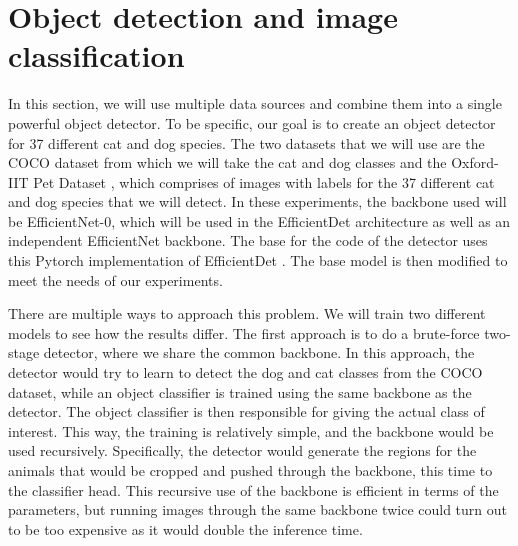 \section{Object detection and image classification}
In this section, we will use multiple data sources and combine them into a single powerful object detector.
To be specific, our goal is to create an object detector for 37 different cat and dog species.
The two datasets that we will use are the COCO dataset \citep{COCO} from which we will take the cat and dog classes and the Oxford-IIT Pet Dataset \citep{catsdogs}, which comprises of images with labels for the 37 different cat and dog species that we will detect.
In these experiments, the backbone used will be EfficientNet-0, which will be used in the EfficientDet architecture as well as an independent EfficientNet backbone.
The base for the code of the detector uses this Pytorch implementation of EfficientDet \citep{pytorch-efficientdet}.
The base model is then modified to meet the needs of our experiments.

There are multiple ways to approach this problem.
We will train two different models to see how the results differ.
The first approach is to do a brute-force two-stage detector, where we share the common backbone.
In this approach, the detector would try to learn to detect the dog and cat classes from the COCO dataset, while an object classifier is trained using the same backbone as the detector.
The object classifier is then responsible for giving the actual class of interest.
This way, the training is relatively simple, and the backbone would be used recursively.
Specifically, the detector would generate the regions for the animals that would be cropped and pushed through the backbone, this time to the classifier head.
This recursive use of the backbone is efficient in terms of the parameters, but running images through the same backbone twice could turn out to be too expensive as it would double the inference time.

